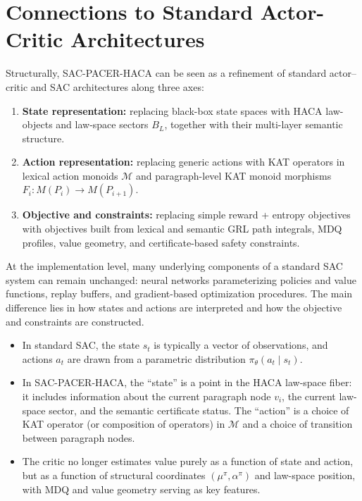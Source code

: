 \documentclass[11pt]{book}
\theoremstyle{plain}
\theoremstyle{definition}
\theoremstyle{remark}
\begin{document}
\section[Connections to Standard Actor-Critic Architectures]{Connections to Standard Actor-Critic Architectures}


Structurally, SAC-PACER-HACA can be seen as a refinement of standard
actor–critic and SAC architectures along three axes:
\begin{enumerate}
  \item \textbf{State representation:} replacing black-box state
        spaces with HACA law-objects and law-space sectors $B_L$,
        together with their multi-layer semantic structure.
  \item \textbf{Action representation:} replacing generic actions with
        KAT operators in lexical action monoids $\mathcal{M}$ and
        paragraph-level KAT monoid morphisms $F_i:M(P_i)\to M(P_{i+1})$.
  \item \textbf{Objective and constraints:} replacing simple reward +
        entropy objectives with objectives built from lexical and
        semantic GRL path integrals, MDQ profiles, value geometry, and
        certificate-based safety constraints.
\end{enumerate}

At the implementation level, many underlying components of a standard
SAC system can remain unchanged: neural networks parameterizing
policies and value functions, replay buffers, and gradient-based
optimization procedures. The main difference lies in how states and
actions are interpreted and how the objective and constraints are
constructed.

\begin{itemize}
  \item In standard SAC, the state $s_t$ is typically a vector of
        observations, and actions $a_t$ are drawn from a parametric
        distribution $\pi_\theta(a_t\mid s_t)$.
  \item In SAC-PACER-HACA, the ``state'' is a point in the HACA
        law-space fiber: it includes information about the current
        paragraph node $v_i$, the current law-space sector, and the
        semantic certificate status. The ``action'' is a choice of
        KAT operator (or composition of operators) in $\mathcal{M}$
        and a choice of transition between paragraph nodes.
  \item The critic no longer estimates value purely as a function of
        state and action, but as a function of structural coordinates
        $(\mu^\pi,\alpha^\pi)$ and law-space position, with MDQ and
        value geometry serving as key features.
\end{itemize}
\end{document}
